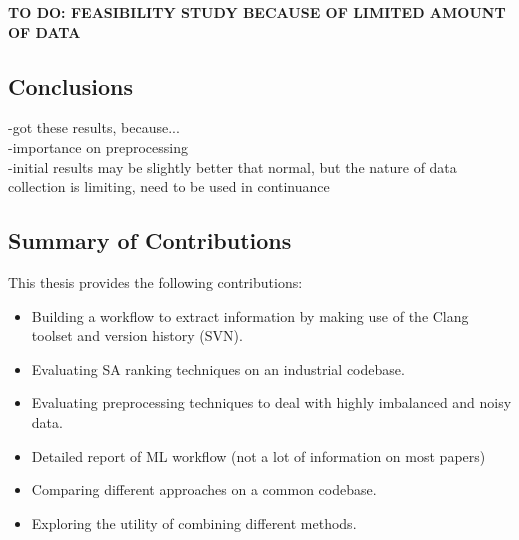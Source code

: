 \documentclass{article}
\begin{document}


\textbf{TO DO: FEASIBILITY STUDY BECAUSE OF LIMITED AMOUNT OF DATA}

\subsection{Conclusions}
-got these results, because...\\
-importance on preprocessing\\
-initial results may be slightly better that normal, but the nature of data collection is limiting, need to be used in continuance\\ 



\subsection{Summary of Contributions}
 
 This thesis provides the following contributions:
 \begin{itemize}
     \item Building a workflow to extract information by making use of the Clang toolset and version history (SVN).
     \item Evaluating SA ranking techniques on an industrial codebase.
     \item Evaluating preprocessing techniques to deal with highly imbalanced and noisy data.
     \item Detailed report of ML workflow (not a lot of information on most papers)
     \item Comparing different approaches on a common codebase.
     \item Exploring the utility of combining different methods.
 \end{itemize}
 
\end{document}
